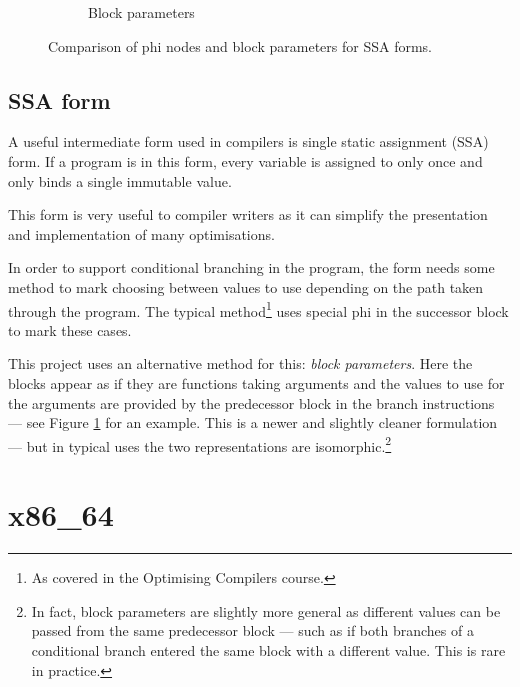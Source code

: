 \begin{figure}[h]
\begin{subfigure}[b]{0.5\textwidth}

        \caption{Block parameters}

    \end{subfigure}
    \caption{Comparison of phi nodes and block parameters for SSA forms.}
    \label{fig:phi-bp}
\end{figure}

\subsection{SSA form} \label{ssa}

A useful intermediate form used in compilers is single static assignment (SSA) form. If a program
is in this form,
every variable is assigned to only once and only binds a single immutable value.

This form is very useful to compiler writers as it can simplify the presentation and implementation
of many optimisations.

In order to support conditional branching in the program, the form needs some method to mark
choosing between values to use depending on the path taken through the program. The typical
method\footnote{As covered in the Optimising Compilers course.} uses special phi in the successor
block to mark these cases.

This project uses an alternative method for this: \emph{block parameters}.
Here the blocks appear as if they are functions taking arguments and the values to use for the
arguments are provided by the predecessor block in the branch instructions --- see Figure
\ref{fig:phi-bp} for an example. This is a newer and slightly cleaner formulation --- but in
typical uses
the two representations are isomorphic.\footnote{In fact, block parameters are slightly more
    general as different values can be passed from the same predecessor block --- such as if both
    branches of a conditional branch entered the same block with a different value. This is rare in
    practice.}

\section{x86\_64}


